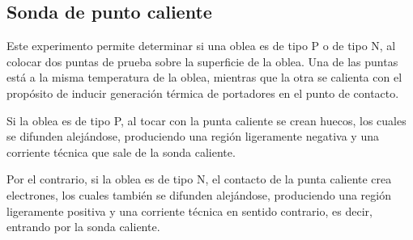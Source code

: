 % 
% 
% 
% 
% 
% 
% 
% 
% 
% 
% 
% 
% 


\subsection{Sonda de punto caliente}

Este experimento permite determinar si una oblea es de tipo P o de tipo N, al colocar dos puntas de prueba sobre la superficie de la oblea. Una de las puntas está a la misma temperatura de la oblea, mientras que la otra se calienta con el propósito de inducir generación térmica de portadores en el punto de contacto.

Si la oblea es de tipo P, al tocar con la punta caliente se crean huecos, los cuales se difunden alejándose, produciendo una región ligeramente negativa y una corriente técnica que sale de la sonda caliente.

Por el contrario, si la oblea es de tipo N, el contacto de la punta caliente crea electrones, los cuales también se difunden alejándose, produciendo una región ligeramente positiva y una corriente técnica en sentido contrario, es decir, entrando por la sonda caliente.

